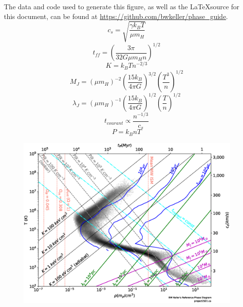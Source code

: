 \documentclass[twocolumn]{article}
\begin{document}
The data and code used to generate this figure, as well as the \LaTeX source for
this document, can be found at \url{https://github.com/bwkeller/phase_guide}. 
\vspace{5cm}
\begin{equation}
c_s = \sqrt{\frac{\gamma k_B T}{\mu m_H}}
\label{sound_speed}
\end{equation}
\begin{equation}
t_{ff} = \left(\frac{3\pi}{32G\mu m_H n}\right)^{1/2}
\label{ff_time}
\end{equation}
\begin{equation}
K = k_BTn^{-2/3}
\label{entropy}
\end{equation}
\begin{equation}
M_J = \left(\mu m_H\right)^{-2}\left(\frac{15k_B}{4\pi G}\right)^{3/2}\left(\frac{T^3}{n}\right)^{1/2}
\label{jeans_mass}
\end{equation}
\begin{equation}
\lambda_J = \left(\mu m_H\right)^{-1}\left(\frac{15k_B}{4\pi G}\right)^{1/2}\left(\frac{T}{n}\right)^{1/2}
\label{jeans_length}
\end{equation}
\begin{equation}
t_{courant} \propto \frac{n^{-1/3}}{c_s}
\label{courant_time}
\end{equation}
\begin{equation}
P = k_B n T
\label{pressure}
\end{equation}

\begin{figure}[hbtp]
\centering
\vspace*{-1cm}
\hspace*{-1cm}
\includegraphics[width=11in]{phase_guide.eps}
\end{figure}
\end{document}
